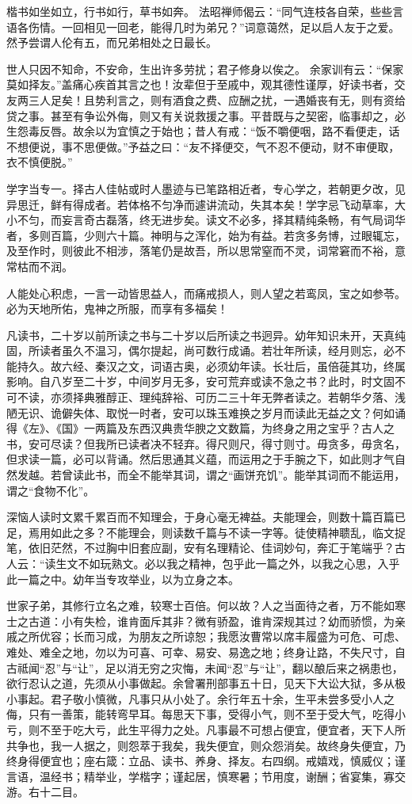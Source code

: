 \documentclass[letterpaper,10pt,english]{sphinxmanual}
\begin{document}
楷书如坐如立，行书如行，草书如奔。
法昭禅师偈云：“同气连枝各自荣，些些言语各伤情。一回相见一回老，能得几时为弟兄？”词意蔼然，足以启人友于之爱。然予尝谓人伦有五，而兄弟相处之日最长。

世人只因不知命，不安命，生出许多劳扰；君子修身以俟之。
余家训有云：“保家莫如择友。”盖痛心疾首其言之也！汝辈但于至戚中，观其德性谨厚，好读书者，交友两三人足矣！且势利言之，则有酒食之费、应酬之扰，一遇婚丧有无，则有资给贷之事。甚至有争讼外侮，则又有关说救援之事。平昔既与之契密，临事却之，必生怨毒反唇。故余以为宜慎之于始也；昔人有戒：“饭不嚼便咽，路不看便走，话不想便说，事不思便做。”予益之曰：“友不择便交，气不忍不便动，财不审便取，衣不慎便脱。”

学字当专一。择古人佳帖或时人墨迹与已笔路相近者，专心学之，若朝更夕改，见异思迁，鲜有得成者。若体格不匀净而遽讲流动，失其本矣！学字忌飞动草率，大小不匀，而妄言奇古磊落，终无进步矣。读文不必多，择其精纯条畅，有气局词华者，多则百篇，少则六十篇。神明与之浑化，始为有益。若贪多务博，过眼辄忘，及至作时，则彼此不相涉，落笔仍是故吾，所以思常窒而不灵，词常窘而不裕，意常枯而不润。

人能处心积虑，一言一动皆思益人，而痛戒损人，则人望之若鸾凤，宝之如参苓。必为天地所佑，鬼神之所服，而享有多福矣！

凡读书，二十岁以前所读之书与二十岁以后所读之书迥异。幼年知识未开，天真纯固，所读者虽久不温习，偶尔提起，尚可数行成诵。若壮年所读，经月则忘，必不能持久。故六经、秦汉之文，词语古奥，必须幼年读。长壮后，虽倍蓰其功，终属影响。自八岁至二十岁，中间岁月无多，安可荒弃或读不急之书？此时，时文固不可不读，亦须择典雅醇正、理纯辞裕、可历二三十年无弊者读之。若朝华夕落、浅陋无识、诡僻失体、取悦一时者，安可以珠玉难换之岁月而读此无益之文？何如诵得《左》、《国》一两篇及东西汉典贵华腴之文数篇，为终身之用之宝乎？古人之书，安可尽读？但我所已读者决不轻弃。得尺则尺，得寸则寸。毋贪多，毋贪名，但求读一篇，必可以背诵。然后思通其义蕴，而运用之于手腕之下，如此则才气自然发越。若曾读此书，而全不能举其词，谓之“画饼充饥”。能举其词而不能运用，谓之“食物不化”。

深恼人读时文累千累百而不知理会，于身心毫无裨益。夫能理会，则数十篇百篇已足，焉用如此之多？不能理会，则读数千篇与不读一字等。徒使精神聩乱，临文捉笔，依旧茫然，不过胸中旧套应副，安有名理精论、佳词妙句，奔汇于笔端乎？古人云：“读生文不如玩熟文。必以我之精神，包乎此一篇之外，以我之心思，入乎此一篇之中。幼年当专攻举业，以为立身之本。

世家子弟，其修行立名之难，较寒士百倍。何以故？人之当面待之者，万不能如寒士之古道：小有失检，谁肯面斥其非？微有骄盈，谁肯深规其过？幼而骄惯，为亲戚之所优容；长而习成，为朋友之所谅恕；我愿汝曹常以席丰履盛为可危、可虑、难处、难全之地，勿以为可喜、可幸、易安、易逸之地；终身让路，不失尺寸，自古祗闻“忍”与“让”，足以消无穷之灾悔，未闻“忍”与“让”，翻以酿后来之祸患也，欲行忍认之道，先须从小事做起。余曾署刑部事五十日，见天下大讼大狱，多从极小事起。君子敬小慎微，凡事只从小处了。余行年五十余，生平未尝多受小人之侮，只有一善策，能转弯早耳。每思天下事，受得小气，则不至于受大气，吃得小亏，则不至于吃大亏，此生平得力之处。凡事最不可想占便宜，便宜者，天下人所共争也，我一人据之，则怨萃于我矣，我失便宜，则众怨消矣。故终身失便宜，乃终身得便宜也；座右箴：立品、读书、养身、择友。右四纲。戒嬉戏，慎威仪；谨言语，温经书；精举业，学楷字；谨起居，慎寒暑；节用度，谢酬；省宴集，寡交游。右十二目。
\end{document}
